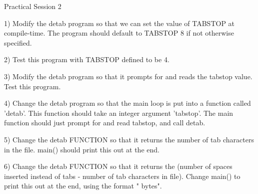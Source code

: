 Practical Session 2

1) Modify the detab program so that we can set the value of TABSTOP at
compile-time. The program should default to TABSTOP 8 if not otherwise
specified.

2) Test this program with TABSTOP defined to be 4.

3) Modify the detab program so that it prompts for and reads the
tabstop value. Test this program.

4) Change the detab program so that the main loop is put into a
function called 'detab'. This function should take an integer argument
'tabstop'. The main function should just prompt for and read tabstop,
and call detab.

5) Change the detab FUNCTION so that it returns the number of tab
characters in the file. main() should print this out at the end.

6) Change the detab FUNCTION so that it returns the (number of spaces
inserted instead of tabs - number of tab characters in file). Change
main() to print this out at the end, using the format "%
bytes\n".

